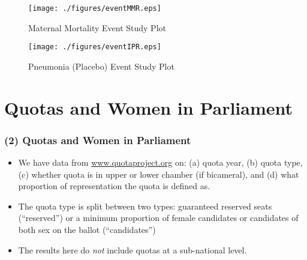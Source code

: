 \documentclass[10pt,letterpaper,subeqn]{beamer}
\begin{document}
\begin{frame}
\begin{figure}
\caption{Maternal Mortality Event Study Plot}
\texttt{[image: ./figures/eventMMR.eps]}
\end{figure}
\end{frame}

\begin{frame}
\begin{figure}
\caption{Pneumonia (Placebo) Event Study Plot}
\texttt{[image: ./figures/eventIPR.eps]}
\end{figure}
\end{frame}




\section{Quotas and Women in Parliament}






\begin{frame}
\frametitle{(2) Quotas and Women in Parliament}
\begin{itemize}
\setlength{\itemsep}{15pt}
\item We have data from \url{www.quotaproject.org} on: (a) quota year, (b) quota type, (c) whether quota is in upper or lower chamber (if bicameral), and (d) what proportion of representation the quota is defined as.
\item The quota type is split between two types: guaranteed reserved seats (``reserved'') or a minimum proportion of female candidates  or candidates of both sex on the ballot (``candidates'')
\item The results here do \emph{not} include quotas at a sub-national level.
\end{itemize}
\end{frame}
\end{document}
